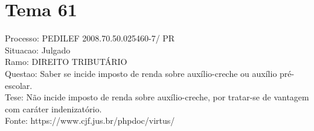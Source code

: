 \documentclass[12pt]{article}
\begin{document}
\section*{Tema 61}
Processo: PEDILEF 2008.70.50.025460-7/ PR\\
Situacao: Julgado\\
Ramo: DIREITO TRIBUTÁRIO\\
Questao: Saber se incide imposto de renda sobre auxílio-creche ou auxílio pré-escolar.\\
Tese: Não incide imposto de renda sobre auxílio-creche, por tratar-se de vantagem com caráter indenizatório.\\
Fonte: https://www.cjf.jus.br/phpdoc/virtus/
\end{document}
